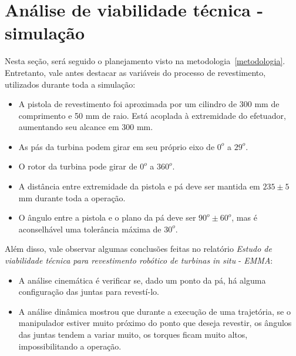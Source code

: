 \section{Análise de viabilidade técnica - simulação}

Nesta seção, será seguido o planejamento visto na metodologia~\ref{metodologia}.
Entretanto, vale antes destacar as variáveis do processo de revestimento,
utilizados durante toda a simulação:

\begin{itemize}
  \item A pistola de revestimento foi aproximada por um cilindro de 300 mm de
  comprimento e 50 mm de raio. Está acoplada à extremidade do efetuador,
  aumentando seu alcance em 300 mm.
  \item As pás da turbina podem girar em seu próprio eixo de $0^o$ a $29^o$.
  \item O rotor da turbina pode girar de $0^o$ a $360^o$.
  \item A distância entre extremidade da pistola e pá deve ser mantida em $235
  \pm 5$ mm durante toda a operação.
  \item O ângulo entre a pistola e o plano da pá deve ser $90^o \pm 60^o$, mas
  é aconselhável uma tolerância máxima de $30^o$.
\end{itemize}

Além disso, vale observar algumas conclusões feitas no relatório \emph{Estudo de
viabilidade técnica para revestimento robótico de turbinas} \textit{in situ} -
\emph{EMMA}:
\begin{itemize}
  \item A análise cinemática é verificar se, dado um ponto da pá, há alguma
  configuração das juntas para revestí-lo.
  \item A análise dinâmica mostrou que durante a execução de uma trajetória,
  se o manipulador estiver muito próximo do ponto que deseja revestir, os
  ângulos das juntas tendem a variar muito, os torques ficam muito altos,
  impossibilitando a operação.
\end{itemize}




 
